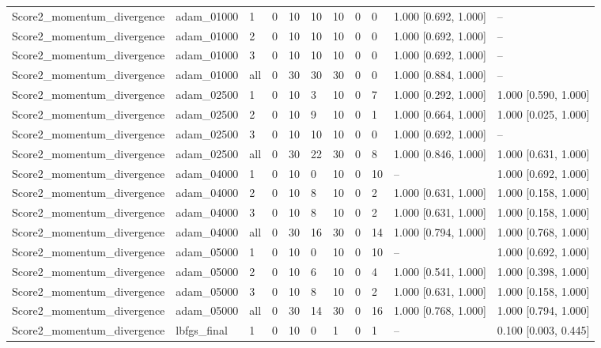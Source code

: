 \begin{longtable}{lllllllllll}
Score2\_momentum\_divergence & adam\_01000 & 1 & 0 & 10 & 10 & 10 & 0 & 0 & 1.000 [0.692, 1.000] & -- \\
Score2\_momentum\_divergence & adam\_01000 & 2 & 0 & 10 & 10 & 10 & 0 & 0 & 1.000 [0.692, 1.000] & -- \\
Score2\_momentum\_divergence & adam\_01000 & 3 & 0 & 10 & 10 & 10 & 0 & 0 & 1.000 [0.692, 1.000] & -- \\
Score2\_momentum\_divergence & adam\_01000 & all & 0 & 30 & 30 & 30 & 0 & 0 & 1.000 [0.884, 1.000] & -- \\
Score2\_momentum\_divergence & adam\_02500 & 1 & 0 & 10 & 3 & 10 & 0 & 7 & 1.000 [0.292, 1.000] & 1.000 [0.590, 1.000] \\
Score2\_momentum\_divergence & adam\_02500 & 2 & 0 & 10 & 9 & 10 & 0 & 1 & 1.000 [0.664, 1.000] & 1.000 [0.025, 1.000] \\
Score2\_momentum\_divergence & adam\_02500 & 3 & 0 & 10 & 10 & 10 & 0 & 0 & 1.000 [0.692, 1.000] & -- \\
Score2\_momentum\_divergence & adam\_02500 & all & 0 & 30 & 22 & 30 & 0 & 8 & 1.000 [0.846, 1.000] & 1.000 [0.631, 1.000] \\
Score2\_momentum\_divergence & adam\_04000 & 1 & 0 & 10 & 0 & 10 & 0 & 10 & -- & 1.000 [0.692, 1.000] \\
Score2\_momentum\_divergence & adam\_04000 & 2 & 0 & 10 & 8 & 10 & 0 & 2 & 1.000 [0.631, 1.000] & 1.000 [0.158, 1.000] \\
Score2\_momentum\_divergence & adam\_04000 & 3 & 0 & 10 & 8 & 10 & 0 & 2 & 1.000 [0.631, 1.000] & 1.000 [0.158, 1.000] \\
Score2\_momentum\_divergence & adam\_04000 & all & 0 & 30 & 16 & 30 & 0 & 14 & 1.000 [0.794, 1.000] & 1.000 [0.768, 1.000] \\
Score2\_momentum\_divergence & adam\_05000 & 1 & 0 & 10 & 0 & 10 & 0 & 10 & -- & 1.000 [0.692, 1.000] \\
Score2\_momentum\_divergence & adam\_05000 & 2 & 0 & 10 & 6 & 10 & 0 & 4 & 1.000 [0.541, 1.000] & 1.000 [0.398, 1.000] \\
Score2\_momentum\_divergence & adam\_05000 & 3 & 0 & 10 & 8 & 10 & 0 & 2 & 1.000 [0.631, 1.000] & 1.000 [0.158, 1.000] \\
Score2\_momentum\_divergence & adam\_05000 & all & 0 & 30 & 14 & 30 & 0 & 16 & 1.000 [0.768, 1.000] & 1.000 [0.794, 1.000] \\
Score2\_momentum\_divergence & lbfgs\_final & 1 & 0 & 10 & 0 & 1 & 0 & 1 & -- & 0.100 [0.003, 0.445] \\

\end{longtable}
